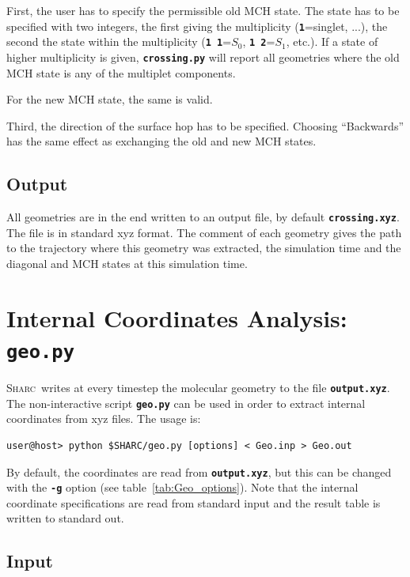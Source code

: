 \documentclass[a4paper,11pt,DIV=15,openany,twoside=false]{scrbook}
\newcommand{\sharc}{\textsc{Sharc}}
\newcommand{\ttt}[1]{\textbf{\texttt{#1}}}
\begin{document}
First, the user has to specify the permissible old MCH state. The state has to be specified with two integers, the first giving the multiplicity (\ttt{1}=singlet, ...), the second the state within the multiplicity (\ttt{1 1}=$S_0$, \ttt{1 2}=$S_1$, etc.). If a state of higher multiplicity is given, \ttt{crossing.py} will report all geometries where the old MCH state is any of the multiplet components. 

For the new MCH state, the same is valid.

Third, the direction of the surface hop has to be specified. Choosing ``Backwards'' has the same effect as exchanging the old and new MCH states. 

\subsection{Output}

All geometries are in the end written to an output file, by default \ttt{crossing.xyz}. The file is in standard xyz format. The comment of each geometry gives the path to the trajectory where this geometry was extracted, the simulation time and the diagonal and MCH states at this simulation time. 





\section{Internal Coordinates Analysis: \ttt{geo.py}}\label{sec:geo.py}

\sharc\ writes at every timestep the molecular geometry to the file \ttt{output.xyz}. The non-interactive script \ttt{geo.py} can be used in order to extract internal coordinates from xyz files. The usage is:
\begin{verbatim}
user@host> python $SHARC/geo.py [options] < Geo.inp > Geo.out
\end{verbatim}
By default, the coordinates are read from \ttt{output.xyz}, but this can be changed with the \ttt{-g} option (see table~\ref{tab:Geo_options}). Note that the internal coordinate specifications are read from standard input and the result table is written to standard out. 

\subsection{Input}
\end{document}
